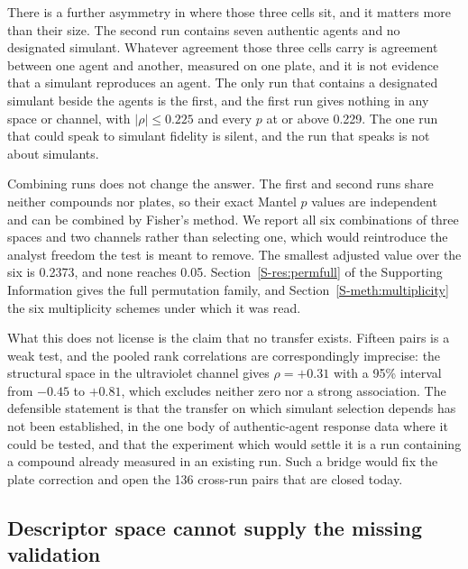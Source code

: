 \documentclass[journal=jacsat,manuscript=article,margin=1in]{achemso}
\begin{document}
There is a further asymmetry in where those three cells sit, and it matters
more than their size. The second run contains seven authentic agents and no
designated simulant. Whatever agreement those three cells carry is
agreement between one agent and another, measured on one plate, and it is
not evidence that a simulant reproduces an agent. The only run that
contains a designated simulant beside the agents is the first, and the
first run gives nothing in any space or channel, with $|\rho| \le 0.225$ and
every $p$ at or above 0.229. The one run that could speak to simulant
fidelity is silent, and the run that speaks is not about simulants.

Combining runs does not change the answer. The first and second runs share
neither compounds nor plates, so their exact Mantel $p$ values are
independent and can be combined by Fisher's method. We report all six
combinations of three spaces and two channels rather than selecting one,
which would reintroduce the analyst freedom the test is meant to remove.
The smallest adjusted value over the six is 0.2373, and none reaches 0.05.
Section~\ref{S-res:permfull} of the Supporting Information gives the full
permutation family, and Section~\ref{S-meth:multiplicity} the six
multiplicity schemes under which it was read.

What this does not license is the claim that no transfer exists. Fifteen
pairs is a weak test, and the pooled rank correlations are correspondingly
imprecise: the structural space in the ultraviolet channel gives
$\rho=+0.31$ with a 95\% interval from $-0.45$ to $+0.81$, which excludes
neither zero nor a strong association. The defensible statement is that the
transfer on which simulant selection depends has not been established, in
the one body of authentic-agent response data where it could be tested, and
that the experiment which would settle it is a run containing a compound
already measured in an existing run. Such a bridge would fix the plate
correction and open the 136 cross-run pairs that are closed today.

\subsection{Descriptor space cannot supply the missing validation}
\label{res:panels}
\end{document}
